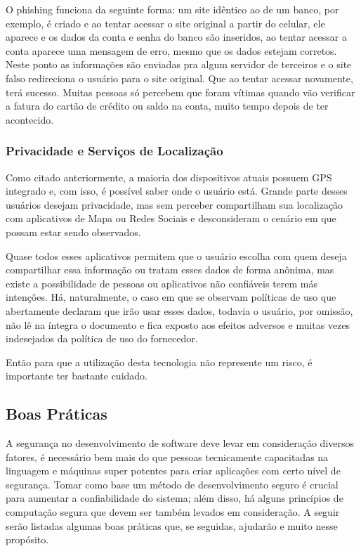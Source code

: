 O phishing funciona da seguinte forma: um site idêntico ao de um banco, por exemplo, é criado e ao tentar acessar o site original a partir do celular, ele aparece e os dados da conta e senha do banco são inseridos, ao tentar acessar a conta aparece uma mensagem de erro, mesmo que os dados estejam corretos. Neste ponto as informações são enviadas pra algum servidor de terceiros e o site falso redireciona o usuário para o site original. Que ao tentar acessar novamente, terá sucesso. Muitas pessoas só percebem que foram vítimas quando vão verificar a fatura do cartão de crédito ou saldo na conta, muito tempo depois de ter acontecido. 

\subsubsection{ Privacidade e Serviços de Localização}
Como citado anteriormente, a maioria dos dispositivos atuais possuem GPS integrado e, com isso, é possível saber onde o usuário está. Grande parte desses usuários desejam privacidade, mas sem perceber compartilham sua localização com aplicativos de Mapa ou Redes Sociais e desconsideram o cenário em que possam estar sendo observados. 

Quase todos esses aplicativos permitem que o usuário escolha com quem deseja compartilhar essa informação ou tratam esses dados de forma anônima, mas existe a possibilidade de pessoas ou aplicativos não confiáveis terem más intenções. Há, naturalmente, o caso em que se observam políticas de uso que abertamente declaram que irão usar esses dados, todavia o usuário, por omissão, não lê na íntegra o documento e fica exposto aos efeitos adversos e muitas vezes indesejados da política de uso do fornecedor. 

Então para que a utilização desta tecnologia não represente um risco, é importante ter bastante cuidado. \cite{DWIVEDI} 

\subsection{Boas Práticas}
A segurança no desenvolvimento de software deve levar em consideração diversos fatores, é necessário bem mais do que pessoas tecnicamente capacitadas na linguagem e máquinas super potentes para criar aplicações com certo nível de segurança. Tomar como base um método de desenvolvimento seguro é crucial para aumentar a confiabilidade do sistema; além disso, há alguns princípios de computação segura que devem ser também levados em consideração.
A seguir serão listadas algumas boas práticas que, se seguidas, ajudarão e muito nesse propósito.

